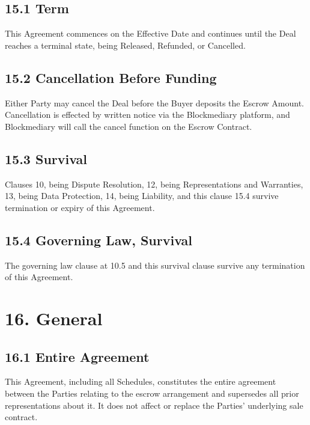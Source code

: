 \documentclass[12pt, a4paper]{article}
\begin{document}
\subsection*{15.1 Term}

This Agreement commences on the Effective Date and continues until the Deal reaches a
terminal state, being Released, Refunded, or Cancelled.

\subsection*{15.2 Cancellation Before Funding}

Either Party may cancel the Deal before the Buyer deposits the Escrow Amount. Cancellation
is effected by written notice via the Blockmediary platform, and Blockmediary will call
the cancel function on the Escrow Contract.

\subsection*{15.3 Survival}

Clauses 10, being Dispute Resolution, 12, being Representations and Warranties, 13, being
Data Protection, 14, being Liability, and this clause 15.4 survive termination or expiry
of this Agreement.

\subsection*{15.4 Governing Law, Survival}

The governing law clause at 10.5 and this survival clause survive any termination of this
Agreement.

\section*{16. General}

\subsection*{16.1 Entire Agreement}

This Agreement, including all Schedules, constitutes the entire agreement between the
Parties relating to the escrow arrangement and supersedes all prior representations about
it. It does not affect or replace the Parties' underlying sale contract.
\end{document}
